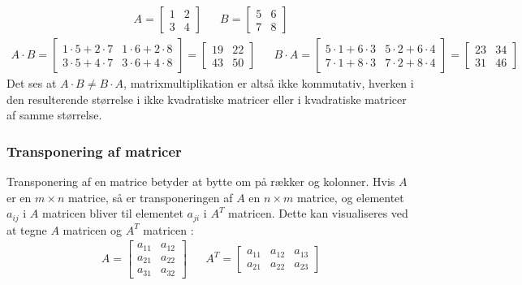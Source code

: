 \documentclass{article}
\begin{document}
\begin{align}
  A = \begin{bmatrix}
    1 & 2 \\
    3 & 4
  \end{bmatrix}
  &&
  B = \begin{bmatrix}
    5 & 6 \\
    7 & 8
  \end{bmatrix}
\end{align}
\begin{align}
  A \cdot B = \begin{bmatrix}
    1 \cdot 5 + 2 \cdot 7 & 1 \cdot 6 + 2 \cdot 8 \\
    3 \cdot 5 + 4 \cdot 7 & 3 \cdot 6 + 4 \cdot 8
  \end{bmatrix} = \begin{bmatrix}
    19 & 22 \\
    43 & 50
  \end{bmatrix}
  &&
  B \cdot A = \begin{bmatrix}
    5 \cdot 1 + 6 \cdot 3 & 5 \cdot 2 + 6 \cdot 4 \\
    7 \cdot 1 + 8 \cdot 3 & 7 \cdot 2 + 8 \cdot 4
  \end{bmatrix} = \begin{bmatrix}
    23 & 34 \\
    31 & 46
  \end{bmatrix}
\end{align}
Det ses at $A \cdot B \neq B \cdot A$, matrixmultiplikation er altså ikke kommutativ, hverken i den resulterende størrelse i ikke kvadratiske matricer eller i kvadratiske matricer af samme størrelse. \parencite{Lauritzen_2019}
\subsubsection{Transponering af matricer}
Transponering af en matrice betyder at bytte om på rækker og kolonner. Hvis $A$ er en $m \times n$ matrice, så er transponeringen af $A$ en $n \times m$ matrice, og elementet $a_{ij}$ i $A$ matricen bliver til elementet $a_{ji}$ i $A^T$ matricen. Dette kan visualiseres ved at tegne $A$ matricen og $A^T$ matricen \parencite{Lauritzen_2019}:
\begin{align}
  A = \begin{bmatrix}
    a_{11} & a_{12} \\
    a_{21} & a_{22} \\
    a_{31} & a_{32}
  \end{bmatrix}
  &&
  A^T = \begin{bmatrix}
    a_{11} & a_{12} & a_{13} \\
    a_{21} & a_{22} & a_{23}
  \end{bmatrix}
\end{align}
\end{document}
